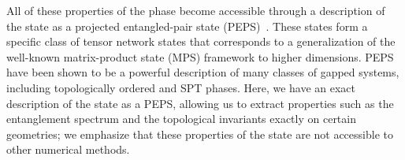 All of these properties of the phase become accessible through a description of the state
as a projected entangled-pair state (PEPS)~\cite{verstraete2004}. These states form a specific class of tensor
network states that corresponds to a generalization of the well-known matrix-product state (MPS)
framework to higher dimensions. PEPS have been shown to be a powerful description of many
classes of gapped systems, including topologically ordered and SPT phases. Here, we have an
exact description of the state as a PEPS, allowing us to extract properties such as the entanglement
spectrum and the topological invariants exactly on certain geometries; we emphasize that these
properties of the state are not accessible to other numerical methods.



